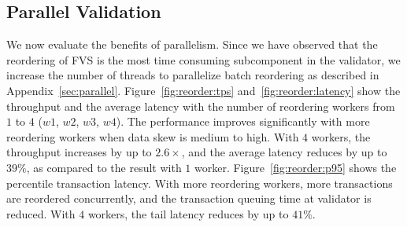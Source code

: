 
\subsection{Parallel Validation}
\label{sec:experiments:parallel}


We now evaluate the benefits of parallelism. Since we have observed that the reordering of FVS is the most time consuming subcomponent in the validator, we increase the number of threads to parallelize batch reordering as described in Appendix~\ref{sec:parallel}. 
Figure~\ref{fig:reorder:tps} and~\ref{fig:reorder:latency} show the throughput
and the average latency with the number of reordering workers from $1$ to $4$
($w1$, $w2$, $w3$, $w4$). The performance improves significantly with more reordering workers when data skew is medium to high. With $4$ workers, the throughput increases by up to $2.6\times$, and the average latency reduces by up to $39\%$, as compared to the result with $1$ worker. Figure~\ref{fig:reorder:p95} shows the percentile transaction latency. With more reordering workers, more transactions are reordered concurrently, and the transaction queuing time at validator is reduced. With $4$ workers, the tail latency reduces by up to $41\%$.

